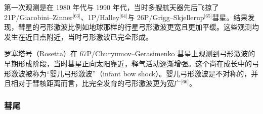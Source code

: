 第一次观测是在 1980 年代与 1990 年代，当时多艘航天器先后飞掠了 21P/Giacobini–Zinner\(^\text{[63]}\)、1P/Halley\(^\text{[64]}\)与 26P/Grigg–Skjellerup\(^\text{[65]}\)彗星。结果发现，彗星的弓形激波比例如地球那样的行星弓形激波更宽且更加平缓。这些观测均发生在近日点附近，当时弓形激波已完全形成。

罗塞塔号（Rosetta）在 67P/Churyumov–Gerasimenko 彗星上观测到弓形激波的早期形成阶段，当时彗星正向太阳靠近，释气活动逐渐增强。这个尚在成长中的弓形激波被称为“婴儿弓形激波”（infant bow shock）。婴儿弓形激波是不对称的，并且相对于彗核距离而言，比完全发育的弓形激波更为宽广\(^\text{[66]}\)。
\subsubsection{彗尾}







